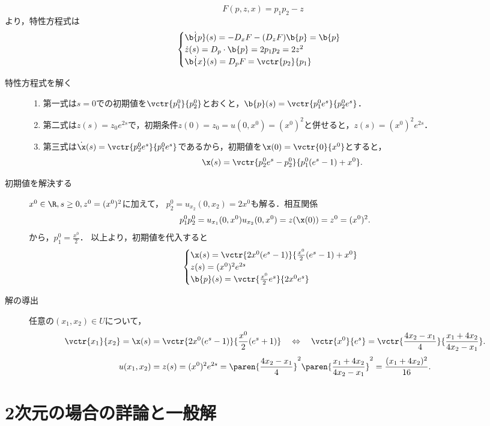 \documentclass[uplatex,dvipdfmx]{jsreport}
\begin{document}
\begin{Proof}
    \[F(p,z,x)=p_1p_2-z\]
    より，特性方程式は
    \[\begin{cases}
        \dot{\b{p}}(s)=-D_xF-(D_zF)\b{p}=\b{p}\\
        \dot{z}(s)=D_p\cdot\b{p}=2p_1p_2=2z^2\\
        \dot{\b{x}}(s)=D_pF=\vctr{p_2}{p_1}
    \end{cases}\]
    \begin{description}
        \item[特性方程式を解く] 
        \begin{enumerate}
            \item 第一式は$s=0$での初期値を$\vctr{p^0_1}{p^0_2}$とおくと，$\b{p}(s)=\vctr{p^0_1e^s}{p^0_2e^s}$．
            \item 第二式は$z(s)=z_0e^{2s}$で，初期条件$z(0)=z_0=u(0,x^0)=(x^0)^2$と併せると，$z(s)=(x^0)^2e^{2s}$．
            \item 第三式は$\dot{\x}(s)=\vctr{p^0_2e^s}{p_1^0e^s}$であるから，初期値を$\x(0)=\vctr{0}{x^0}$とすると，
            \[\x(s)=\vctr{p_2^0e^s-p_2^0}{p^0_1(e^s-1)+x^0}.\]
        \end{enumerate}
        \item[初期値を解決する] $x^0\in\R,s\ge0,z^0=(x^0)^2$に加えて，
        $p^0_2=u_{x_2}(0,x_2)=2x^0$も解る．相互関係
        \[p^0_1p^0_2=u_{x_1}(0,x^0)u_{x_2}(0,x^0)=z(\x(0))=z^0=(x^0)^2.\]
        から，$p_1^0=\frac{x^0}{2}$．
        以上より，初期値を代入すると
        \[\begin{cases}
            \x(s)=\vctr{2x^0(e^s-1)}{\frac{x^0}{2}(e^s-1)+x^0}\\
            z(s)=(x^0)^2e^{2s}\\
            \b{p}(s)=\vctr{\frac{x^0}{2}e^s}{2x^0e^s}
        \end{cases}\]
        \item[解の導出] 任意の$(x_1,x_2)\in U$について，
        \[\vctr{x_1}{x_2}=\x(s)=\vctr{2x^0(e^s-1)}{\frac{x^0}{2}(e^s+1)}\quad\Leftrightarrow\quad\vctr{x^0}{e^s}=\vctr{\frac{4x_2-x_1}{4}}{\frac{x_1+4x_2}{4x_2-x_1}}.\]
        \[u(x_1,x_2)=z(s)=(x^0)^2e^{2s}=\paren{\frac{4x_2-x_1}{4}}^2\paren{\frac{x_1+4x_2}{4x_2-x_1}}^2=\frac{(x_1+4x_2)^2}{16}.\]
    \end{description}
\end{Proof}

\section{2次元の場合の詳論と一般解}
\end{document}
